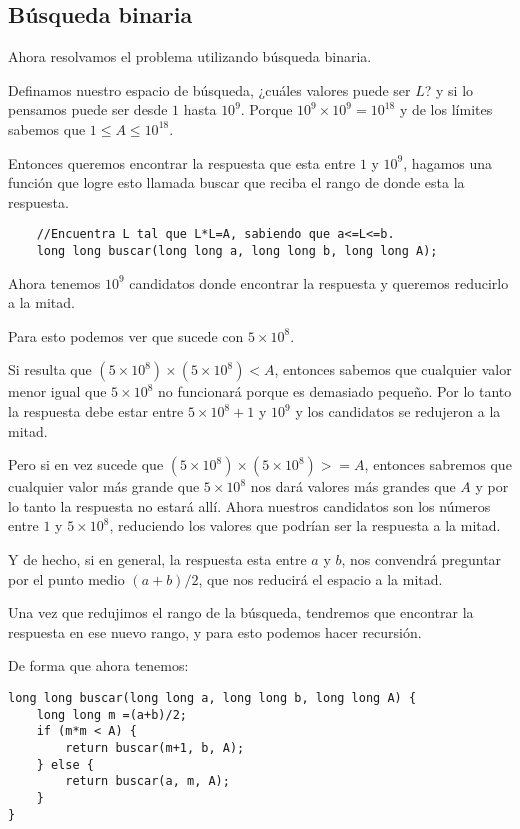 \subsection*{Búsqueda binaria}
Ahora resolvamos el problema utilizando búsqueda binaria.

Definamos nuestro espacio de búsqueda, ¿cuáles valores puede ser \(L\)? y si lo pensamos puede ser desde \(1\) hasta \(10^9\). Porque \(10^9\times 10^9=10^{18}\) y de los límites sabemos que \(1\leq A\leq 10^{18}\).

Entonces queremos encontrar la respuesta que esta entre \(1\) y \(10^9\), hagamos una función que logre esto llamada buscar que reciba el rango de donde esta la respuesta.

\begin{lstlisting}
	//Encuentra L tal que L*L=A, sabiendo que a<=L<=b.
	long long buscar(long long a, long long b, long long A);
\end{lstlisting}

Ahora tenemos \(10^9\) candidatos donde encontrar la respuesta y queremos reducirlo a la mitad. 

Para esto podemos ver que sucede con \(5\times10^8\). 

Si resulta que \((5\times10^8)\times(5\times10^8) <A\), entonces sabemos que cualquier valor menor igual que \(5 \times 10^8\) no funcionará porque es demasiado pequeño. Por lo tanto la respuesta debe estar entre \(5\times 10^8 +1\) y \(10^9\) y los candidatos se redujeron a la mitad.

Pero si en vez sucede que \((5\times10^8)\times(5\times10^8) >=A\), entonces sabremos que cualquier valor más grande que \(5\times 10^8\) nos dará valores más grandes que \(A\) y por lo tanto la respuesta no estará allí. Ahora nuestros candidatos son los números entre \(1\) y \(5\times 10^8\), reduciendo los valores que podrían ser la respuesta a la mitad.

Y de hecho, si en general, la respuesta esta entre \(a\) y \(b\), nos convendrá preguntar por el punto medio \((a+b)/2\), que nos reducirá el espacio a la mitad.

Una vez que redujimos el rango de la búsqueda, tendremos que encontrar la respuesta en ese nuevo rango, y para esto podemos hacer recursión.

De forma que ahora tenemos:

\begin{minipage}{\linewidth}	
\begin{lstlisting}
long long buscar(long long a, long long b, long long A) {
	long long m =(a+b)/2;
	if (m*m < A) {
		return buscar(m+1, b, A);
	} else {
		return buscar(a, m, A);
	}
} 
\end{lstlisting}

\end{minipage}


